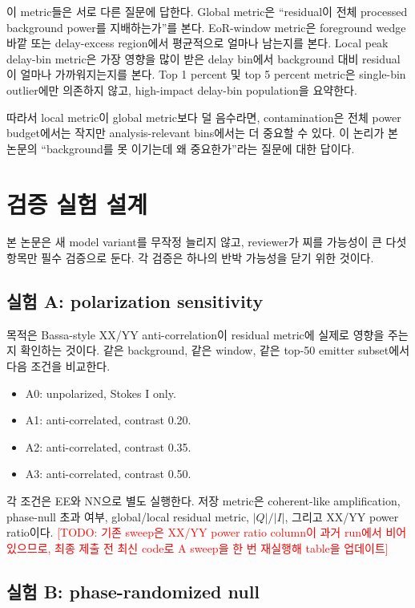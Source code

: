 \documentclass[11pt,a4paper]{article}
\newcommand{\todo}[1]{\textcolor{red}{[TODO: #1]}}
\begin{document}
이 metric들은 서로 다른 질문에 답한다.
Global metric은 ``residual이 전체 processed background power를 지배하는가''를 본다.
EoR-window metric은 foreground wedge 바깥 또는 delay-excess region에서 평균적으로 얼마나 남는지를 본다.
Local peak delay-bin metric은 가장 영향을 많이 받은 delay bin에서 background 대비 residual이 얼마나 가까워지는지를 본다.
Top 1 percent 및 top 5 percent metric은 single-bin outlier에만 의존하지 않고, high-impact delay-bin population을 요약한다.

따라서 local metric이 global metric보다 덜 음수라면, contamination은 전체 power budget에서는 작지만 analysis-relevant bins에서는 더 중요할 수 있다.
이 논리가 본 논문의 ``background를 못 이기는데 왜 중요한가''라는 질문에 대한 답이다.

\section{검증 실험 설계}

본 논문은 새 model variant를 무작정 늘리지 않고, reviewer가 찌를 가능성이 큰 다섯 항목만 필수 검증으로 둔다.
각 검증은 하나의 반박 가능성을 닫기 위한 것이다.

\subsection{실험 A: polarization sensitivity}

목적은 Bassa-style XX/YY anti-correlation이 residual metric에 실제로 영향을 주는지 확인하는 것이다.
같은 background, 같은 window, 같은 top-50 emitter subset에서 다음 조건을 비교한다.

\begin{itemize}
  \item A0: unpolarized, Stokes I only.
  \item A1: anti-correlated, contrast 0.20.
  \item A2: anti-correlated, contrast 0.35.
  \item A3: anti-correlated, contrast 0.50.
\end{itemize}

각 조건은 EE와 NN으로 별도 실행한다.
저장 metric은 coherent-like amplification, phase-null 초과 여부, global/local residual metric, $|Q|/|I|$, 그리고 XX/YY power ratio이다.
\todo{기존 sweep은 XX/YY power ratio column이 과거 run에서 비어 있으므로, 최종 제출 전 최신 code로 A sweep을 한 번 재실행해 table을 업데이트}

\subsection{실험 B: phase-randomized null}
\end{document}
